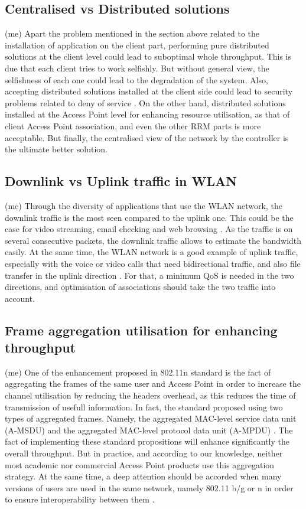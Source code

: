 \documentclass[journal,transmag]{IEEEtran}
\begin{document}
\subsection{Centralised vs Distributed solutions} (me)
Apart the problem mentioned in the section above related to the installation of application on the client part, performing pure distributed solutions at the client level could lead to suboptimal whole throughput. This is due that each client tries to work selfishly. But without general view, the selfishness of each one could lead to the degradation of the system. Also, accepting distributed solutions installed at the client side could lead to security problems related to deny of service \cite{15dynamic_AP_association_SDN}. On the other hand, distributed solutions installed at the Access Point level for enhancing resource utilisation, as that of client Access Point association, and even the other RRM parts is more acceptable. But finally, the centralised view of the network by the controller is the ultimate better solution.

\subsection{Downlink vs Uplink traffic in WLAN} (me)
Through the diversity of applications that use the WLAN network, the downlink traffic is the most seen compared to the uplink one. This could be the case for video streaming, email checking and web browsing \cite{16improving_AP_association_channel_utilisation_adaptive_probing}. As the traffic is on several consecutive packets, the downlink traffic allows to estimate the bandwidth easily. At the same time, the WLAN network is a good example of uplink traffic, especially with the voice or video calls that need bidirectional traffic, and also file transfer in the uplink direction \cite{11contention_traffic_load_aware_association}. For that, a minimum QoS is needed in the two directions, and optimisation of associations should take the two traffic into account. 

\subsection{Frame aggregation utilisation for enhancing throughput} (me)
One of the enhancement proposed in 802.11n standard is the fact of aggregating the frames of the same user and Access Point in order to increase the channel utilisation by reducing the headers overhead, as this reduces the time of transmission of usefull information. In fact, the standard proposed using two types of aggregated frames. Namely, the aggregated MAC-level service data unit (A-MSDU) and the aggregated MAC-level protocol data unit (A-MPDU) \cite{16channel_measurment_AP_selection}. The fact of implementing these standard propositions will enhance significantly the overall throughput. But in practice, and according to our knowledge, neither most academic nor commercial Access Point products use this aggregation strategy. At the same time, a deep attention should be accorded when many versions of users are used in the same network, namely 802.11 b/g or n in order to ensure interoperability between them \cite{14online_AP_association_80211n}. 
\end{document}
